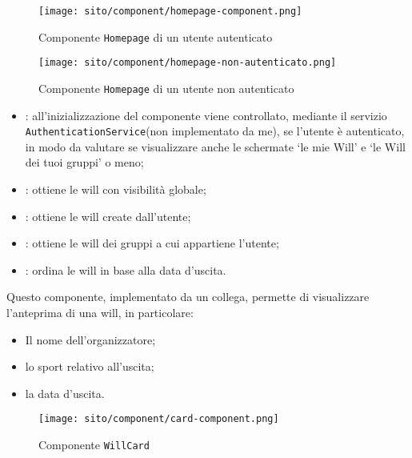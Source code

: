 \begin{figure}[H] 
    \centerline{\texttt{[image: sito/component/homepage-component.png]}}
    \caption{Componente \texttt{Homepage} di un utente autenticato}
\end{figure}

\begin{figure}[H] 
    \centerline{\texttt{[image: sito/component/homepage-non-autenticato.png]}}
    \caption{Componente \texttt{Homepage} di un utente non autenticato}
\end{figure}


\begin{itemize}
    \item {}: all'inizializzazione del componente viene controllato, mediante il servizio \texttt{AuthenticationService}(non implementato da me), se l'utente è autenticato, in modo da valutare se visualizzare anche le schermate \enquote*{le mie Will} e \enquote*{le Will dei tuoi gruppi} o meno;
    \item {}: ottiene le \gls{will} con visibilità globale;
    \item {}: ottiene le \gls{will} create dall'utente;
    \item {}: ottiene le \gls{will} dei gruppi a cui appartiene l'utente;
    \item {}: ordina le \gls{will} in base alla data d'uscita. 
\end{itemize}


\label{par:WillCard}
Questo componente, implementato da un collega, permette di visualizzare l'anteprima di una \gls{will}, in particolare: 
\begin{itemize}
    \item Il nome dell'organizzatore;
    \item lo sport relativo all'uscita;
    \item la data d'uscita.
\end{itemize}

\begin{figure}[H] 
    \centering 
    \texttt{[image: sito/component/card-component.png]} 
    \caption{Componente \texttt{WillCard}}
\end{figure}

